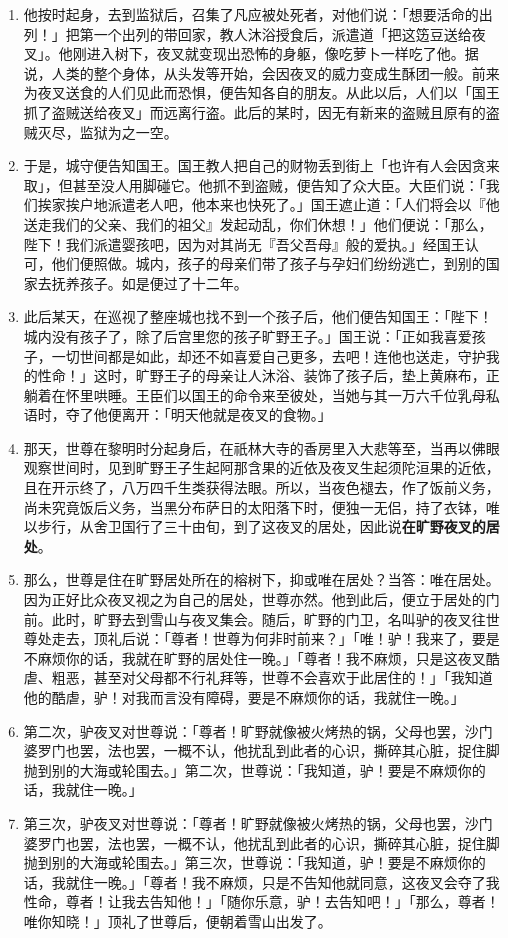 \begin{enumerate}
\item 他按时起身，去到监狱后，召集了凡应被处死者，对他们说：「想要活命的出列！」把第一个出列的带回家，教人沐浴授食后，派遣道「把这笾豆送给夜叉」。他刚进入树下，夜叉就变现出恐怖的身躯，像吃萝卜一样吃了他。据说，人类的整个身体，从头发等开始，会因夜叉的威力变成生酥团一般。前来为夜叉送食的人们见此而恐惧，便告知各自的朋友。从此以后，人们以「国王抓了盗贼送给夜叉」而远离行盗。此后的某时，因无有新来的盗贼且原有的盗贼灭尽，监狱为之一空。
\item 于是，城守便告知国王。国王教人把自己的财物丢到街上「也许有人会因贪来取」，但甚至没人用脚碰它。他抓不到盗贼，便告知了众大臣。大臣们说：「我们挨家挨户地派遣老人吧，他本来也快死了。」国王遮止道：「人们将会以『他送走我们的父亲、我们的祖父』发起动乱，你们休想！」他们便说：「那么，陛下！我们派遣婴孩吧，因为对其尚无『吾父吾母』般的爱执。」经国王认可，他们便照做。城内，孩子的母亲们带了孩子与孕妇们纷纷逃亡，到别的国家去抚养孩子。如是便过了十二年。
\item 此后某天，在巡视了整座城也找不到一个孩子后，他们便告知国王：「陛下！城内没有孩子了，除了后宫里您的孩子旷野王子。」国王说：「正如我喜爱孩子，一切世间都是如此，却还不如喜爱自己更多，去吧！连他也送走，守护我的性命！」这时，旷野王子的母亲让人沐浴、装饰了孩子后，垫上黄麻布，正躺着在怀里哄睡。王臣们以国王的命令来至彼处，当她与其一万六千位乳母私语时，夺了他便离开：「明天他就是夜叉的食物。」
\item 那天，世尊在黎明时分起身后，在祇林大寺的香房里入大悲等至，当再以佛眼观察世间时，见到旷野王子生起阿那含果的近依及夜叉生起须陀洹果的近依，且在开示终了，八万四千生类获得法眼。所以，当夜色褪去，作了饭前义务，尚未究竟饭后义务，当黑分布萨日的太阳落下时，便独一无侣，持了衣钵，唯以步行，从舍卫国行了三十由旬，到了这夜叉的居处，因此说\textbf{在旷野夜叉的居处}。
\item 那么，世尊是住在旷野居处所在的榕树下，抑或唯在居处？当答：唯在居处。因为正好比众夜叉视之为自己的居处，世尊亦然。他到此后，便立于居处的门前。此时，旷野去到雪山与夜叉集会。随后，旷野的门卫，名叫驴的夜叉往世尊处走去，顶礼后说：「尊者！世尊为何非时前来？」「唯！驴！我来了，要是不麻烦你的话，我就在旷野的居处住一晚。」「尊者！我不麻烦，只是这夜叉酷虐、粗恶，甚至对父母都不行礼拜等，世尊不会喜欢于此居住的！」「我知道他的酷虐，驴！对我而言没有障碍，要是不麻烦你的话，我就住一晚。」
\item 第二次，驴夜叉对世尊说：「尊者！旷野就像被火烤热的锅，父母也罢，沙门婆罗门也罢，法也罢，一概不认，他扰乱到此者的心识，撕碎其心脏，捉住脚抛到别的大海或轮围去。」第二次，世尊说：「我知道，驴！要是不麻烦你的话，我就住一晚。」
\item 第三次，驴夜叉对世尊说：「尊者！旷野就像被火烤热的锅，父母也罢，沙门婆罗门也罢，法也罢，一概不认，他扰乱到此者的心识，撕碎其心脏，捉住脚抛到别的大海或轮围去。」第三次，世尊说：「我知道，驴！要是不麻烦你的话，我就住一晚。」「尊者！我不麻烦，只是不告知他就同意，这夜叉会夺了我性命，尊者！让我去告知他！」「随你乐意，驴！去告知吧！」「那么，尊者！唯你知晓！」顶礼了世尊后，便朝着雪山出发了。

\end{enumerate}
